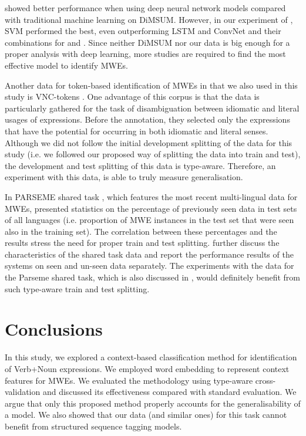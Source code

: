 \documentclass[output=paper,modfonts,nonflat]{langsci/langscibook}
\begin{document}
\cite{Gharbieh2017} showed better performance when using deep neural network models compared with traditional machine learning on DiMSUM. However, in our experiment of , SVM performed the best, even outperforming LSTM and ConvNet and their combinations for  and .
Since neither DiMSUM nor our data is big enough for a proper analysis with deep learning, more studies are required to find the most effective model to identify MWEs.

Another data for token-based identification of MWEs in  that we also used in this study is VNC-tokens \citep{cook2008vnc}. One advantage of this corpus is that the data is particularly gathered for the task of disambiguation between idiomatic and literal usages of expressions. Before the annotation, they selected only the expressions that have the potential for occurring in both idiomatic and literal senses. 
Although we did not follow the initial development splitting of the data for this study (i.e. we followed our proposed way of splitting the data into train and test),
the development and test splitting of this data is type-aware. Therefore, an experiment with this data, is able to truly measure generalisation. %

In PARSEME shared task \citep{MWEWorkshop}, which features the most recent multi-lingual data for MWEs, \cite{maldonado2017} presented statistics on the percentage of previously seen data in test sets of all languages (i.e. proportion of MWE instances in the test set that were seen also in the training set). The correlation between these percentages and the results stress the need for proper train and test splitting.   further discuss the characteristics of the shared task data and report the performance results of the systems on seen and un-seen data separately.  
The experiments with the data for the Parseme shared task, which is also discussed in , would definitely benefit from such type-aware train and test splitting.

\section{Conclusions}
In this study, we explored a context-based classification method for identification of Verb+Noun expressions. We employed word embedding to represent context features for MWEs. We evaluated the methodology using type-aware cross-validation and discussed its effectiveness compared with standard evaluation. We argue that only this proposed method properly accounts for the generalisability of a model. We also showed that our data (and similar ones) for this task cannot benefit from structured sequence tagging models.
\end{document}

